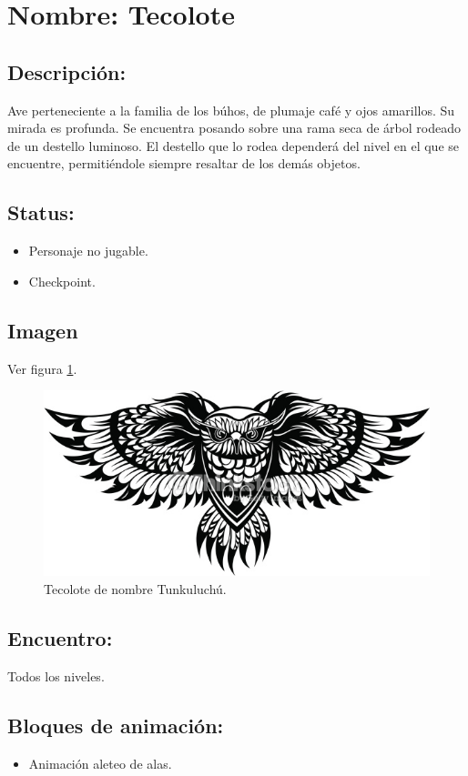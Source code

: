 \section{Nombre: Tecolote}   \label{per:tecolote}
\subsection{Descripción:}
Ave perteneciente a la familia de los búhos, de plumaje café y ojos amarillos. Su mirada es profunda. Se encuentra posando sobre una rama seca de árbol rodeado de un destello luminoso. El destello que lo rodea dependerá del nivel en el que se encuentre, permitiéndole siempre resaltar de los demás objetos.
\subsection{Status:}
	\begin{itemize}
		\item Personaje no jugable.
		\item Checkpoint.
	\end{itemize}
\subsection{Imagen}
Ver figura \ref{fig:tecolote}.
\begin{figure}
	\centering
	\includegraphics[height=0.2 \textheight]{Imagenes/tecolote}
	\caption{Tecolote de nombre Tunkuluchú.}
	\label{fig:tecolote}
\end{figure}
\subsection{Encuentro:}
Todos los niveles.
\subsection{Bloques de animación:}
\begin{itemize}
	\item Animación aleteo de alas.
\end{itemize}